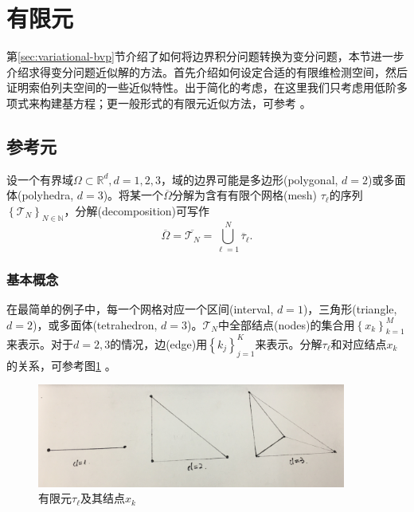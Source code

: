 \section{有限元}
\label{sec:finele}

第\ref{sec:variational-bvp}节介绍了如何将边界积分问题转换为变分问题，本节进一步介绍求得变分问题近似解的方法。首先介绍如何设定合适的有限维检测空间，然后证明索伯列夫空间的一些近似特性。出于简化的考虑，在这里我们只考虑用低阶多项式来构建基方程；更一般形式的有限元近似方法，可参考 \cite{Cheng:2005cd,Brenner:2008hf}。

\subsection{参考元}
\label{sec:finele-reference-elements}
设一个有界域$\Omega \subset \mathbb{R}^{d}, d=1,2,3$，域的边界可能是多边形(polygonal, $d=2$)或多面体(polyhedra, $d=3$)。将某一个$\overline{\Omega}$分解为含有有限个网格(mesh) $\tau_{\ell}$的序列$\left\{ \mathcal{T}_{N} \right\}_{N \in \mathbb{N}}$，分解(decomposition)可写作
\begin{equation}
  \label{eq:finele-ref-decomposition}
  \overline{\Omega} = \overline{\mathcal{T}_{N}} = \bigcup_{\ell = 1}^{N} \overline{\tau}_{\ell}.
\end{equation}

\subsubsection{基本概念}
在最简单的例子中，每一个网格对应一个区间(interval, $d=1$)，三角形(triangle, $d=2$)，或多面体(tetrahedron, $d=3$)。$\mathcal{T}_{N}$中全部结点(nodes)的集合用$\left\{ x_{k} \right\}_{k=1}^{M}$来表示。对于$d=2,3$的情况，边(edge)用$\left\{ k_{j} \right\}_{j=1}^{K}$来表示。分解$\tau_{\ell}$和对应结点$x_{k}$的关系，可参考图\ref{fig:finele-ref-element-nodes}
。

\begin{figure}[htbp]
  \centering
  \includegraphics[width=4in]{./figures/20171209-finele-nodes}
 \caption{有限元$\tau_{\ell}$及其结点$x_{k}$}
\label{fig:finele-ref-element-nodes}

\end{figure}


